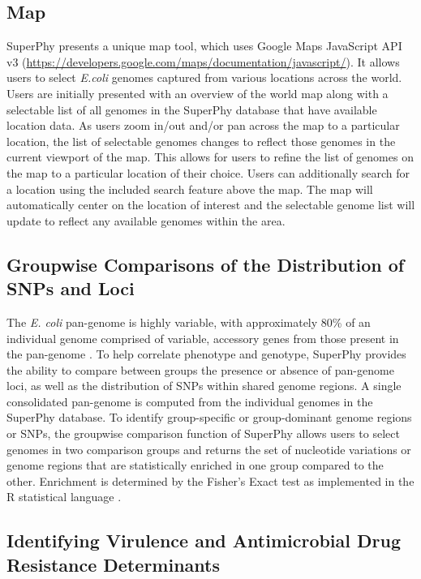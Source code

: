 \documentclass[a4paper,twoside]{article}
\begin{document}
\subsection{Map}
SuperPhy presents a unique map tool, which uses Google Maps JavaScript API v3 (\url{https://developers.google.com/maps/documentation/javascript/}). It allows users to select \textit{E.coli} genomes captured from various locations across the world. Users are initially presented with an overview of the world map along with a selectable list of all genomes in the SuperPhy database that have available location data. As users zoom in/out and/or pan across the map to a particular location, the list of selectable genomes changes to reflect those genomes in the current viewport of the map. This allows for users to refine the list of genomes on the map to a particular location of their choice. Users can additionally search for a location using the included search feature above the map. The map will automatically center on the location of interest and the selectable genome list will update to reflect any available genomes within the area.  

\subsection{Groupwise Comparisons of the Distribution of SNPs and Loci}

The \textit{E. coli} pan-genome is highly variable, with approximately 80\% of an individual genome comprised of variable, accessory genes from those present in the pan-genome \cite{lukjancenko_comparison_2010}. To help correlate phenotype and genotype, SuperPhy provides the ability to compare between groups the presence or absence of pan-genome loci, as well as the distribution of SNPs within shared genome regions. A single consolidated pan-genome is computed from the individual genomes in the SuperPhy database. To identify group-specific or group-dominant genome regions or SNPs, the groupwise comparison function of SuperPhy allows users to select genomes in two comparison groups and returns the set of nucleotide variations or genome regions that are statistically enriched in one group compared to the other. Enrichment is determined by the Fisher's Exact test as implemented in the R statistical language \cite{R_manual}.


\subsection{Identifying Virulence and Antimicrobial Drug Resistance Determinants}
\end{document}
